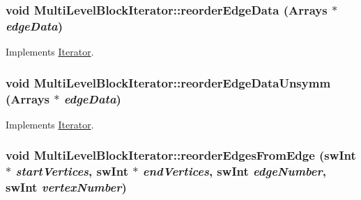 \label{classMultiLevelBlockIterator_a2c8b4ee175d96866d03cf0196312a4ea}
\hypertarget{classMultiLevelBlockIterator_a6db1df64cc6cb8c7fdc8ad6587f51a87}{
\subsubsection[{reorderEdgeData}]{\setlength{\rightskip}{0pt plus 5cm}void MultiLevelBlockIterator::reorderEdgeData ({\bf Arrays} $\ast$ {\em edgeData})}}
\label{classMultiLevelBlockIterator_a6db1df64cc6cb8c7fdc8ad6587f51a87}


Implements \hyperlink{classIterator_a4a803a634065aba90c6a7572542aa8c3}{Iterator}.\hypertarget{classMultiLevelBlockIterator_a96adad6f8220ff77653f75150bbd1b3c}{
\subsubsection[{reorderEdgeDataUnsymm}]{\setlength{\rightskip}{0pt plus 5cm}void MultiLevelBlockIterator::reorderEdgeDataUnsymm ({\bf Arrays} $\ast$ {\em edgeData})}}
\label{classMultiLevelBlockIterator_a96adad6f8220ff77653f75150bbd1b3c}


Implements \hyperlink{classIterator_aea73c3b4ba7c3cb6c56df6c5ddbe1f31}{Iterator}.\hypertarget{classMultiLevelBlockIterator_a329b89b35011569fd4c4c3e93518eea3}{
\subsubsection[{reorderEdgesFromEdge}]{\setlength{\rightskip}{0pt plus 5cm}void MultiLevelBlockIterator::reorderEdgesFromEdge ({\bf swInt} $\ast$ {\em startVertices}, \/  {\bf swInt} $\ast$ {\em endVertices}, \/  {\bf swInt} {\em edgeNumber}, \/  {\bf swInt} {\em vertexNumber})}}
\label{classMultiLevelBlockIterator_a329b89b35011569fd4c4c3e93518eea3}


